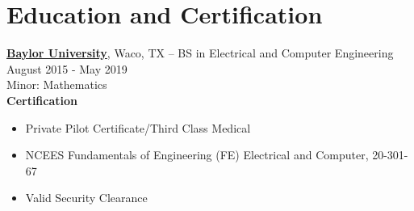 \documentclass[11pt]{article}       %
\begin{document}
\vspace{-18.5pt}

\section*{Education and Certification}
\textbf{\href{https://www.baylor.edu/}{Baylor University}}, Waco, TX -- BS in Electrical and Computer Engineering \hfill August 2015 - May 2019 \\
Minor: Mathematics\\

\textbf{Certification}
\begin{itemize}
   \item Private Pilot Certificate/Third Class Medical
   \item NCEES Fundamentals of Engineering (FE) Electrical and Computer, 20-301-67
   \item Valid Security Clearance
\end{itemize}
\end{document}
